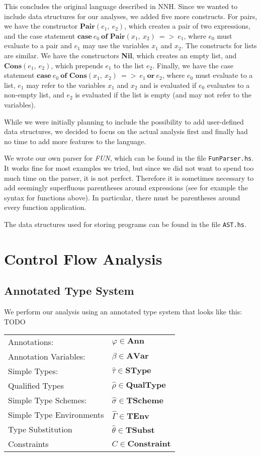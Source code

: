 \documentclass[a4paper,11pt]{article}
\begin{document}
This concludes the original language described in NNH. Since we wanted to include data structures for our analyses, we added five more constructs. For pairs, we have the constructor $\textbf{Pair}(e_1,\:e_2)$, which creates a pair of two expressions, and the case statement $\textbf{case}\:e_0\:\textbf{of Pair}(x_1,\:x_2)\:=>\:e_1$, where $e_0$ must evaluate to a pair and $e_1$ may use the variables $x_1$ and $x_2$. The constructs for lists are similar. We have the constructors \textbf{Nil}, which creates an empty list, and $\textbf{Cons}(e_1,\:e_2)$, which prepends $e_1$ to the list $e_2$. Finally, we have the case statement $\textbf{case}\:e_0\:\textbf{of Cons}(x_1,\:x_2)\:=>\:e_1\:\textbf{or}\:e_2$, where $e_0$ must evaluate to a list, $e_1$ may refer to the variables $x_1$ and $x_2$ and is evaluated if $e_0$ evaluates to a non-empty list, and $e_2$ is evaluated if the list is empty (and may not refer to the variables).

While we were initially planning to include the possibility to add user-defined data structures, we decided to focus on the actual analysis first and finally had no time to add more features to the language.

We wrote our own parser for \emph{FUN}, which can be found in the file \texttt{FunParser.hs}. It works fine for most examples we tried, but since we did not want to spend too much time on the parser, it is not perfect. Therefore it is sometimes necessary to add seemingly superfluous parentheses around expressions (see for example the syntax for functions above). In particular, there must be parentheses around every function application. 

The data structures used for storing programs can be found in the file \texttt{AST.hs}.

\section{Control Flow Analysis}


\subsection{Annotated Type System}
We perform our analysis using an annotated type system that looks like this: TODO

\begin{tabular}{l l}
Annotations: & $\varphi \in \textbf{Ann}$ \\
Annotation Variables: &	$\beta  \in \textbf{AVar}$ \\
Simple Types: &		$\hat{\tau} \in \textbf{SType}$ \\
Qualified Types & $\hat{\rho} \in \textbf{QualType}$\\
Simple Type Schemes: &		$\hat{\sigma} \in \textbf{TScheme}$ \\
Simple Type Environments &		$\hat{\Gamma} \in \textbf{TEnv} $ \\
Type Substitution & $\hat{\theta} \in \textbf{TSubst}$\\
Constraints &	$C \in \textbf{Constraint}$ \\
\end{tabular}
\end{document}
